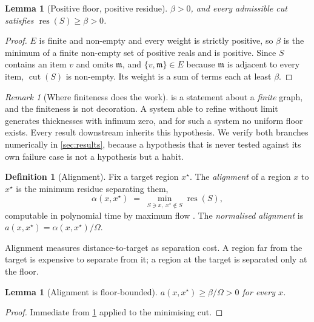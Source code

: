 \documentclass[11pt,twocolumn,a4paper]{article}
\theoremstyle{plain}
\newtheorem{lemma}[theorem]{Lemma}
\theoremstyle{definition}
\newtheorem{definition}[theorem]{Definition}
\theoremstyle{remark}
\newtheorem{remark}[theorem]{Remark}
\newcommand{\med}{\mathfrak{m}}
\newcommand{\cut}{\operatorname{cut}}
\newcommand{\res}{\operatorname{res}}
\newcommand{\flo}{\beta}
\newcommand{\aln}{\alpha}
\newcommand{\Tot}{\Omega}
\newcommand{\target}{x^{\star}}
\begin{document}
\begin{lemma}[Positive floor, positive residue]
\label{lem:floor}
$\flo > 0$, and every admissible cut satisfies $\res(S) \geq \flo > 0$.
\end{lemma}

\begin{proof}
$E$ is finite and non-empty and every weight is strictly positive, so $\flo$ is
the minimum of a finite non-empty set of positive reals and is positive. Since
$S$ contains an item $v$ and omits $\med$, and $\{v,\med\} \in E$ because $\med$
is adjacent to every item, $\cut(S)$ is non-empty. Its weight is a sum of terms
each at least $\flo$.
\end{proof}

\begin{remark}[Where finiteness does the work]
\label{rem:finiteness}
 is a statement about a \emph{finite} graph, and the finiteness
is not decoration. A system able to refine without limit generates thicknesses
with infimum zero, and for such a system no uniform floor exists. Every result
downstream inherits this hypothesis. We verify both branches numerically in
\cref{sec:results}, because a hypothesis that is never tested against its own
failure case is not a hypothesis but a habit.
\end{remark}

\begin{definition}[Alignment]
\label{def:alignment}
Fix a target region $\target$. The \emph{alignment} of a region $x$ to $\target$
is the minimum residue separating them,
\begin{equation}
\aln(x, \target) \;=\; \min_{S \ni x,\ \target \notin S} \res(S),
\label{eq:alignment}
\end{equation}
computable in polynomial time by maximum flow \citep{ford1956,stoer1997}. The
\emph{normalised alignment} is $a(x,\target) = \aln(x,\target)/\Tot$.
\end{definition}

Alignment measures distance-to-target as separation cost. A region far from the
target is expensive to separate from it; a region at the target is separated
only at the floor.

\begin{lemma}[Alignment is floor-bounded]
\label{lem:alignfloor}
$a(x,\target) \geq \flo/\Tot > 0$ for every $x$.
\end{lemma}

\begin{proof}
Immediate from \cref{lem:floor} applied to the minimising cut.
\end{proof}
\end{document}
